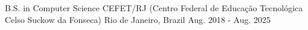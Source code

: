 

\begin{cventries}

  \cventry
    {B.S. in Computer Science} %
    {CEFET/RJ (Centro Federal de Educação Tecnológica Celso Suckow da Fonseca)} %
    {Rio de Janeiro, Brazil} %
    {Aug. 2018 - Aug. 2025} %
    {}
\end{cventries}

